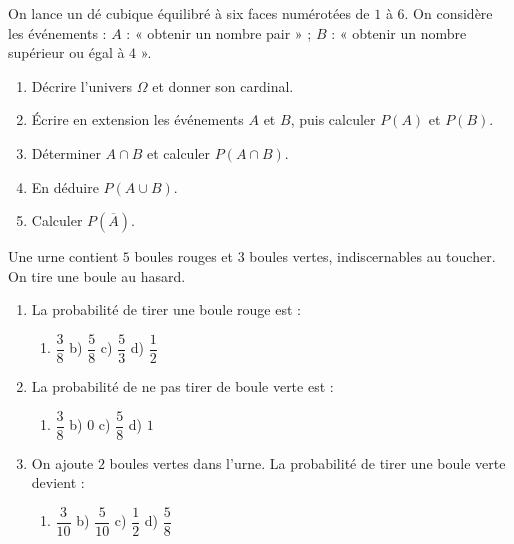 \documentclass[11pt]{article}
\begin{document}
\begin{exercice}[Lancer d'un dé]
On lance un dé cubique équilibré à six faces numérotées de $1$ à $6$. On considère les événements :
$A$ : « obtenir un nombre pair » ; $B$ : « obtenir un nombre supérieur ou égal à $4$ ».
\begin{enumerate}
\item Décrire l'univers $\Omega$ et donner son cardinal.
\item Écrire en extension les événements $A$ et $B$, puis calculer $P(A)$ et $P(B)$.
\item Déterminer $A\cap B$ et calculer $P(A\cap B)$.
\item En déduire $P(A\cup B)$.
\item Calculer $P(\overline{A})$.
\end{enumerate}
\end{exercice}

\begin{exercice}
Une urne contient $5$ boules rouges et $3$ boules vertes, indiscernables au toucher. On tire une boule au hasard.
\begin{enumerate}
\item La probabilité de tirer une boule rouge est :
\begin{enumerate}
\item[a)] $\dfrac{3}{8}$ \quad b) $\dfrac{5}{8}$ \quad c) $\dfrac{5}{3}$ \quad d) $\dfrac{1}{2}$
\end{enumerate}
\item La probabilité de ne pas tirer de boule verte est :
\begin{enumerate}
\item[a)] $\dfrac{3}{8}$ \quad b) $0$ \quad c) $\dfrac{5}{8}$ \quad d) $1$
\end{enumerate}
\item On ajoute $2$ boules vertes dans l'urne. La probabilité de tirer une boule verte devient :
\begin{enumerate}
\item[a)] $\dfrac{3}{10}$ \quad b) $\dfrac{5}{10}$ \quad c) $\dfrac{1}{2}$ \quad d) $\dfrac{5}{8}$
\end{enumerate}
\end{enumerate}
\end{exercice}
\end{document}
